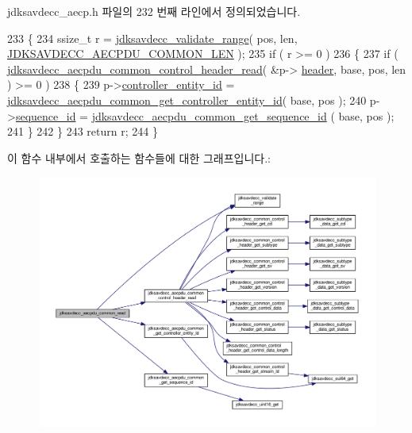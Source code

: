 jdksavdecc\+\_\+aecp.\+h 파일의 232 번째 라인에서 정의되었습니다.


\begin{DoxyCode}
233 \{
234     ssize\_t r = \hyperlink{group__util_ga9c02bdfe76c69163647c3196db7a73a1}{jdksavdecc\_validate\_range}( pos, len, 
      \hyperlink{group__aecpdu_ga1311febb873dfac7b4035ed25460f9d1}{JDKSAVDECC\_AECPDU\_COMMON\_LEN} );
235     \textcolor{keywordflow}{if} ( r >= 0 )
236     \{
237         \textcolor{keywordflow}{if} ( \hyperlink{group__aecpdu_gae8aa0713d6c447632579d077bb12c19f}{jdksavdecc\_aecpdu\_common\_control\_header\_read}( &p->
      \hyperlink{structjdksavdecc__aecpdu__common_a314cacb6a61bcf18749030c0b6fb7510}{header}, base, pos, len ) >= 0 )
238         \{
239             p->\hyperlink{structjdksavdecc__aecpdu__common_affc928ddb4fc62d1d04a775d36e5f2c8}{controller\_entity\_id} = 
      \hyperlink{group__aecpdu__common_ga39f2e24c3c2a66121dd48a25c5c250bc}{jdksavdecc\_aecpdu\_common\_get\_controller\_entity\_id}( base, 
      pos );
240             p->\hyperlink{structjdksavdecc__aecpdu__common_a8f184eb7c16a6d3a501c383ee8ffa200}{sequence\_id} = \hyperlink{group__aecpdu__common_ga4c5015b65543e4753c336d98b63fea28}{jdksavdecc\_aecpdu\_common\_get\_sequence\_id}
      ( base, pos );
241         \}
242     \}
243     \textcolor{keywordflow}{return} r;
244 \}
\end{DoxyCode}


이 함수 내부에서 호출하는 함수들에 대한 그래프입니다.\+:
\nopagebreak
\begin{figure}[H]
\begin{center}
\leavevmode
\includegraphics[width=350pt]{group__aecpdu__common_ga78dffab7a5f742e72d9c58ed9962f1a9_cgraph}
\end{center}
\end{figure}





